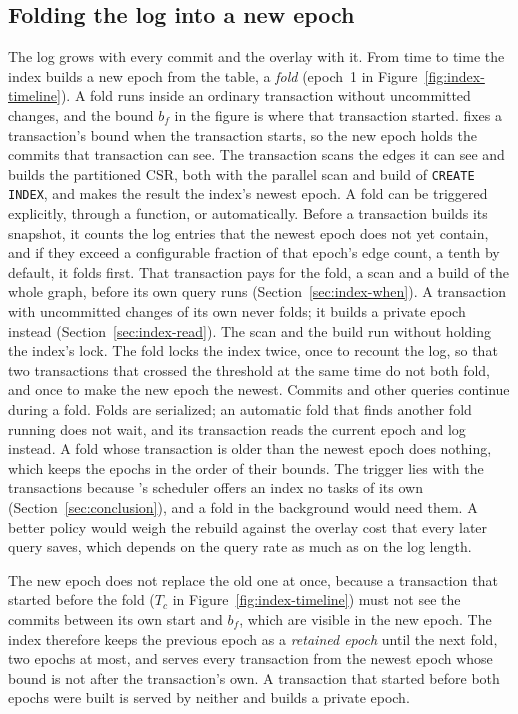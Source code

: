 \subsection{Folding the log into a new epoch}
\label{sec:index-fold}

The log grows with every commit and the overlay with it. From time to time the index builds a new epoch from the
table, a \emph{fold} (epoch~1 in Figure~\ref{fig:index-timeline}). A fold runs inside an ordinary transaction without uncommitted changes, and the bound $b_f$ in the figure is
where that transaction started. \duckdb fixes a transaction's bound when the transaction starts, so the new epoch
holds the commits that transaction can see. The transaction scans the edges it can see and builds the partitioned CSR, both with the parallel scan and
build of \texttt{CREATE INDEX}, and makes the result the index's newest epoch. A fold
can be triggered explicitly, through a function, or automatically. Before a transaction builds its snapshot, it counts
the log entries that the newest epoch does not yet contain, and if they exceed a configurable fraction of that epoch's
edge count, a tenth by default, it folds first. That transaction pays for the fold, a scan and a build of the whole
graph, before its own query runs (Section~\ref{sec:index-when}). A transaction with uncommitted changes of its own never folds; it builds a private epoch instead
(Section~\ref{sec:index-read}). The scan and the build run without holding the index's lock. The fold locks the index
twice, once to recount the log, so that two transactions that crossed the threshold at the same time do not both
fold, and once to make the new epoch the newest. Commits and other queries continue during a fold.
Folds are serialized; an automatic fold that finds another fold running does not wait, and its transaction reads the
current epoch and log instead. A fold whose transaction is older than the newest epoch does nothing, which keeps the epochs in the order of
their bounds. The trigger lies with the transactions because \duckdb's scheduler offers an index no tasks of its own (Section~\ref{sec:conclusion}), and a fold in the background would need them. A better policy would weigh the rebuild against the overlay cost that every later query saves, which depends on the query rate as much as on the log length.

The new epoch does not replace the old one at once, because a transaction that started before the fold
(\mbox{$T_c$} in Figure~\ref{fig:index-timeline}) must not see the commits between its own start and $b_f$, which are visible in the
new epoch. The index therefore keeps the previous epoch as a \emph{retained epoch} until the next fold, two epochs at most,
and serves every transaction from the newest epoch whose bound is not after the transaction's own. A transaction that
started before both epochs were built is served by neither and builds a private epoch.


